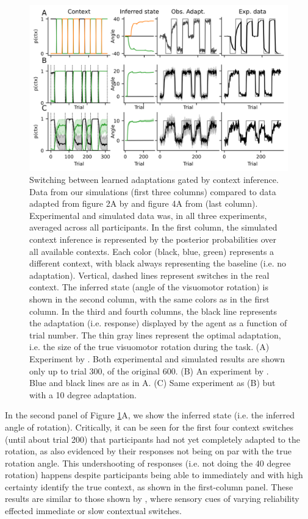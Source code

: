 \documentclass[a4paper,doc,floatsintext,natbib]{apa6}
\def \fref #1{Figure \ref{#1}}     %
\begin{document}
\begin{figure}
\centering
\includegraphics{./figures/figure_2.png}
\caption{Switching between learned adaptations gated by context inference. Data from our simulations (first three columns) compared to data adapted from figure 2A by \cite{Kim_Neural_2015} and figure 4A from \cite{Oh_Minimizing_2019} (last column). Experimental and simulated data was, in all three experiments, averaged across all participants. In the first column, the simulated context inference is represented by the posterior probabilities over all available contexts. Each color (black, blue, green) represents a different context, with black always representing the baseline (i.e. no adaptation). Vertical, dashed lines represent switches in the real context. The inferred state (angle of the visuomotor rotation) is shown in the second column, with the same colors as in the first column. In the third and fourth columns, the black line represents the adaptation (i.e. response) displayed by the agent as a function of trial number. The thin gray lines represent the optimal adaptation, i.e. the size of the true visuomotor rotation during the task. (A) Experiment by \cite{Kim_Neural_2015}. Both experimental and simulated results are shown only up to trial 300, of the original 600. (B) An experiment by \cite{Oh_Minimizing_2019}.  Blue and black lines are as in A. (C) Same experiment as (B) but with a 10 degree adaptation.}
\label{fig:oh-2019}
\end{figure}

In the second panel of \fref{fig:oh-2019}A, we show the inferred state (i.e. the inferred angle of rotation). Critically, it can be seen for the first four context switches (until about trial 200) that participants had not yet completely adapted to the rotation, as also evidenced by their responses not being on par with the true rotation angle. This undershooting of responses (i.e. not doing the 40 degree rotation) happens despite participants being able to immediately and with high certainty identify the true context, as shown in the first-column panel. These results are similar to those shown by \cite{Imamizu_Explicit_2007}, where sensory cues of varying reliability effected immediate or slow contextual switches.
\end{document}
